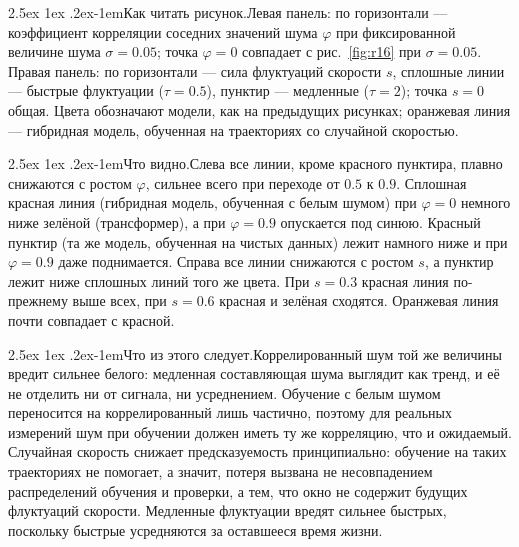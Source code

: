 \documentclass[12pt,a4paper]{report}
\makeatletter
\renewcommand\paragraph{\@startsection{paragraph}{4}{\z@}%
  {2.5ex \@plus1ex \@minus.2ex}{-1em}{\normalfont\normalsize\bfseries}}
\numberwithin{equation}{chapter}
\newcommand{\figread}{\paragraph{Как читать рисунок.}}
\newcommand{\figsee}{\paragraph{Что видно.}}
\newcommand{\figgen}{\paragraph{Что из этого следует.}}
\makeatother
\begin{document}
\figread Левая панель: по горизонтали --- коэффициент корреляции соседних
значений шума $\varphi$ при фиксированной величине шума $\sigma=0.05$; точка
$\varphi=0$ совпадает с рис.~\ref{fig:r16} при $\sigma=0.05$. Правая панель: по
горизонтали --- сила флуктуаций скорости $s$, сплошные линии --- быстрые
флуктуации ($\tau=0.5$), пунктир --- медленные ($\tau=2$); точка $s=0$ общая.
Цвета обозначают модели, как на предыдущих рисунках; оранжевая линия ---
гибридная модель, обученная на траекториях со случайной скоростью.

\figsee Слева все линии, кроме красного пунктира, плавно снижаются с ростом
$\varphi$, сильнее всего при переходе от $0.5$ к $0.9$. Сплошная красная
линия (гибридная модель, обученная с белым шумом) при $\varphi=0$ немного
ниже зелёной (трансформер), а при $\varphi=0.9$ опускается под синюю. Красный
пунктир (та же модель, обученная на чистых данных) лежит намного ниже и при
$\varphi=0.9$ даже поднимается. Справа все линии снижаются с ростом $s$, а
пунктир лежит ниже сплошных линий того же цвета. При $s=0.3$ красная линия
по-прежнему выше всех, при $s=0.6$ красная и зелёная сходятся. Оранжевая
линия почти совпадает с красной.

\figgen Коррелированный шум той же величины вредит сильнее белого:
медленная составляющая шума выглядит как тренд, и её не отделить ни от
сигнала, ни усреднением. Обучение с белым шумом переносится на
коррелированный лишь частично, поэтому для реальных измерений шум при
обучении должен иметь ту же корреляцию, что и ожидаемый. Случайная скорость
снижает предсказуемость принципиально: обучение на таких траекториях не
помогает, а значит, потеря вызвана не несовпадением распределений
обучения и проверки, а тем, что окно не содержит будущих флуктуаций
скорости. Медленные флуктуации вредят сильнее быстрых, поскольку быстрые
усредняются за оставшееся время жизни.
\end{document}
